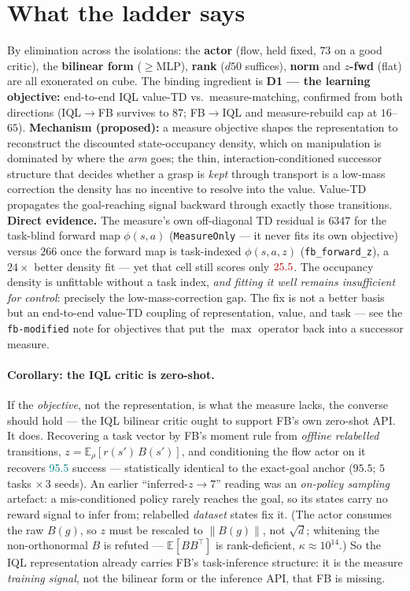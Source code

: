 \documentclass[11pt]{article}
\newcommand{\B}[1]{\textbf{#1}}
\newcommand{\good}[1]{\textcolor{teal}{#1}}
\newcommand{\bad}[1]{\textcolor{red!70!black}{#1}}
\begin{document}
\section{What the ladder says}
\label{sec:whatitsays}
By elimination across the isolations: the \B{actor} (flow, held fixed, $73$ on a
good critic), the \B{bilinear form} ($\ge$MLP), \B{rank} ($d50$ suffices), \B{norm}
and \B{$z$-fwd} (flat) are all exonerated on cube. The binding ingredient is
\B{D1 --- the learning objective:} end-to-end IQL value-TD vs.\ measure-matching,
confirmed from both directions (IQL$\to$FB survives to $87$; FB$\to$IQL and
measure-rebuild cap at $16$--$65$). \B{Mechanism (proposed):} a measure objective
shapes the representation to reconstruct the discounted state-occupancy density,
which on manipulation is dominated by where the \emph{arm} goes; the thin,
interaction-conditioned successor structure that decides whether a grasp is
\emph{kept} through transport is a low-mass correction the density has no incentive
to resolve into the value. Value-TD propagates the goal-reaching signal backward
through exactly those transitions. \B{Direct evidence.} The measure's own
off-diagonal TD residual is $6347$ for the task-blind forward map $\phi(s,a)$
(\texttt{MeasureOnly} --- it never fits its own objective) versus $266$ once the
forward map is task-indexed $\phi(s,a,z)$ (\texttt{fb\_forward\_z}), a $24\times$
better density fit --- yet that cell still scores only $\bad{25.5}$. The occupancy
density is unfittable without a task index, \emph{and fitting it well remains
insufficient for control}: precisely the low-mass-correction gap. The fix is not a
better basis but an end-to-end value-TD coupling of representation, value, and task
--- see the \texttt{fb-modified} note for objectives that put the $\max$ operator
back into a successor measure.

\paragraph{Corollary: the IQL critic is zero-shot.} If the \emph{objective}, not the
representation, is what the measure lacks, the converse should hold --- the IQL
bilinear critic ought to support FB's own zero-shot API. It does. Recovering a task
vector by FB's moment rule from \emph{offline relabelled} transitions,
$z=\mathbb E_\rho[r(s')\,B(s')]$, and conditioning the flow actor on it recovers
\good{95.5} success --- statistically identical to the exact-goal anchor ($95.5$;
$5$ tasks $\times\,3$ seeds). An earlier ``inferred-$z\!\to\!7$'' reading was an
\emph{on-policy sampling} artefact: a mis-conditioned policy rarely reaches the goal,
so its states carry no reward signal to infer from; relabelled \emph{dataset} states
fix it. (The actor consumes the raw $B(g)$, so $z$ must be rescaled to $\|B(g)\|$,
not $\sqrt d$; whitening the non-orthonormal $B$ is refuted --- $\mathbb E[BB^\top]$
is rank-deficient, $\kappa\!\approx\!10^{14}$.) So the IQL representation already
carries FB's task-inference structure: it is the measure \emph{training signal}, not
the bilinear form or the inference API, that FB is missing.
\end{document}
